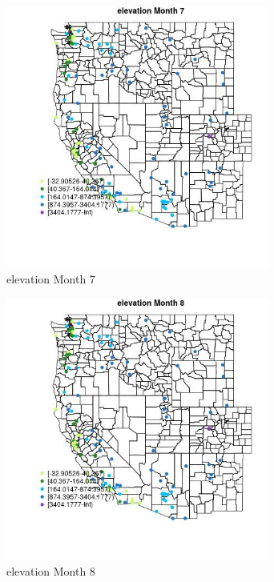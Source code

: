 \begin{figure} 
\centering  
\includegraphics[width=0.77\textwidth]{Code_Outputs/Report_ML_input_PM25_Step4_part_e_de_duplicated_aves_MapObsMo7elevation.jpg} 
\caption{\label{fig:Report_ML_input_PM25_Step4_part_e_de_duplicated_avesMapObsMo7elevation}elevation Month 7} 
\end{figure} 
 

\begin{figure} 
\centering  
\includegraphics[width=0.77\textwidth]{Code_Outputs/Report_ML_input_PM25_Step4_part_e_de_duplicated_aves_MapObsMo8elevation.jpg} 
\caption{\label{fig:Report_ML_input_PM25_Step4_part_e_de_duplicated_avesMapObsMo8elevation}elevation Month 8} 
\end{figure} 
 

